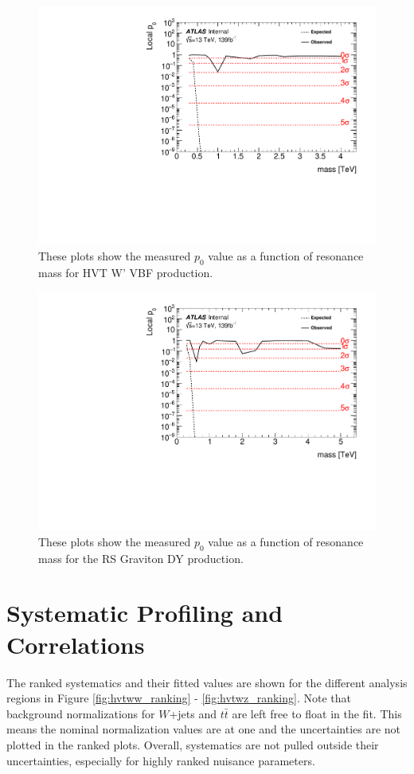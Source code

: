 \begin{figure}[h!]
  \centering
  \includegraphics[width=\hsize]{figures/results/pvalues/hvtwzvbf_pvalue.pdf}
 \caption{These plots show the measured $p_{0}$ value as a function of resonance mass for HVT W' VBF production.} 
  \label{fig:discov_hvtwzvbf}
\end{figure} 
\FloatBarrier


\begin{figure}[h!]
  \centering
  \includegraphics[width=\hsize]{figures/results/pvalues/rsg_pvalue.pdf}
 \caption{These plots show the measured $p_{0}$ value as a function of resonance mass for the RS Graviton DY production.} 
  \label{fig:discov_rsg}
\end{figure} 
\FloatBarrier
\section{Systematic Profiling and Correlations}
The ranked systematics and their fitted values are shown for the different analysis regions in Figure \ref{fig:hvtww_ranking} - \ref{fig:hvtwz_ranking}. Note that background normalizations for $W$+jets and $t\bar{t}$ are left free to float in the fit. This means the nominal normalization values are at one and the uncertainties are not plotted in the ranked plots. Overall, systematics are not pulled outside their uncertainties, especially for highly ranked nuisance parameters. 

